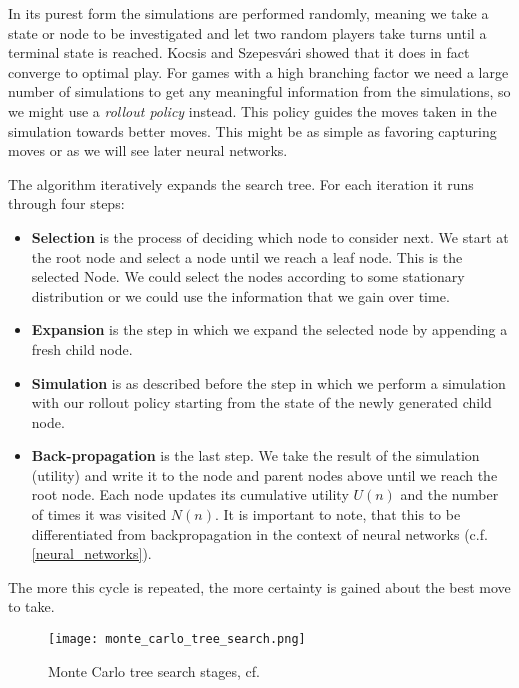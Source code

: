 In its purest form the simulations are performed randomly, meaning we take a state or node to be investigated and let two random players take turns until a terminal state is reached. Kocsis and Szepesvári \cite{kocsis_bandit_2006} showed that it does in fact converge to optimal play. For games with a high branching factor we need a large number of simulations to get any meaningful information from the simulations, so we might use a \textit{rollout policy} instead. This policy guides the moves taken in the simulation towards better moves. This might be as simple as favoring capturing moves or as we will see later neural networks.

The algorithm iteratively expands the search tree. For each iteration it runs through four steps:
\begin{itemize}
    \item \textbf{Selection} is the process of deciding which node to consider next. We start at the root node and select a node until we reach a leaf node. This is the selected Node. We could select the nodes according to some stationary distribution or we could use the information that we gain over time.

    \item \textbf{Expansion} is the step in which we expand the selected node by appending a fresh child node.

    \item \textbf{Simulation} is as described before the step in which we perform a simulation with our rollout policy starting from the state of the newly generated child node.

    \item \textbf{Back-propagation} is the last step. We take the result of the simulation (utility) and write it to the node and parent nodes above until we reach the root node. Each node updates its cumulative utility $U(n)$ and the number of times it was visited $N(n)$. It is important to note, that this to be differentiated from backpropagation in the context of neural networks (c.f. \ref{neural_networks}).
\end{itemize}

The more this cycle is repeated, the more certainty is gained about the best move to take.

\begin{figure}
    \centering
    \texttt{[image: monte\_carlo\_tree\_search.png]}
    \caption{Monte Carlo tree search stages, cf. \cite{noauthor_fig_nodate}}
    \label{monte_carlo_tree_search}
\end{figure}


